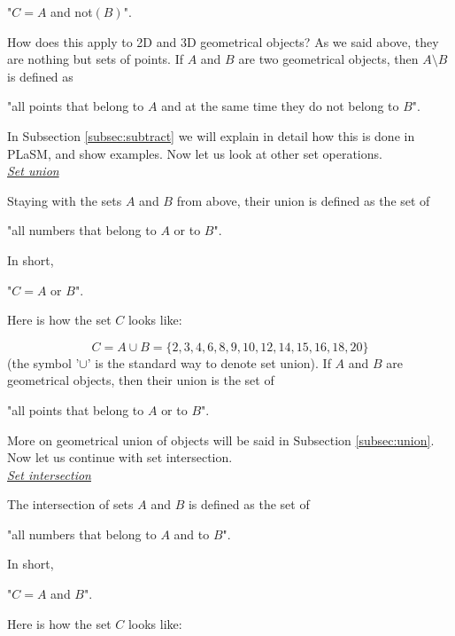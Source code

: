 \documentclass{article}
\begin{document}
\centerline{
"$C = A$ {\color{red}and} {\color{red}not}$(B)$".
}
\vspace{4mm}
\noindent
How does this apply to 2D and 3D geometrical objects? As we said above,
they are nothing but sets of points. If $A$ and $B$ are two geometrical objects,
then $A \setminus B$ is defined as\\

\centerline{
"all points that belong to $A$ {\color{red}and} at the same time they do {\color{red}not} belong to $B$".
}
\vspace{4mm}
\noindent
In Subsection \ref{subsec:subtract} we will explain in detail how this is done 
in PLaSM, and show examples. Now let us look at other set operations.\\

\noindent
\underline{\em Set union}

Staying with the sets $A$ and $B$ from above, their union is defined 
as the set of \\

\centerline{
"all numbers that belong to $A$ {\color{red}or} to $B$".
}
\vspace{4mm}
\noindent
In short,\\

\centerline{
"$C = A$ {\color{red}or} $B$".
}
\vspace{4mm}
\noindent
Here is how the set $C$ looks like:

$$
C = A \cup B = \{2, 3, 4, 6, 8, 9, 10, 12, 14, 15, 16, 18, 20\}
$$
(the symbol '$\cup$' is the standard way to denote set union). If $A$
and $B$ are geometrical objects, then their union is the set of \\

\centerline{
"all points that belong to $A$ {\color{red}or} to $B$".
}
\vspace{4mm}
\noindent
More on geometrical union of objects will be said in 
Subsection \ref{subsec:union}. Now let us continue with 
set intersection.\\

\noindent
\underline{\em Set intersection}

The intersection of sets $A$ and $B$ is defined as the set of \\

\centerline{
"all numbers that belong to $A$ {\color{red}and} to $B$".
}
\vspace{4mm}
\noindent
In short,\\

\centerline{
"$C = A$ {\color{red}and} $B$".
}
\vspace{4mm}
\noindent
Here is how the set $C$ looks like:
\end{document}
